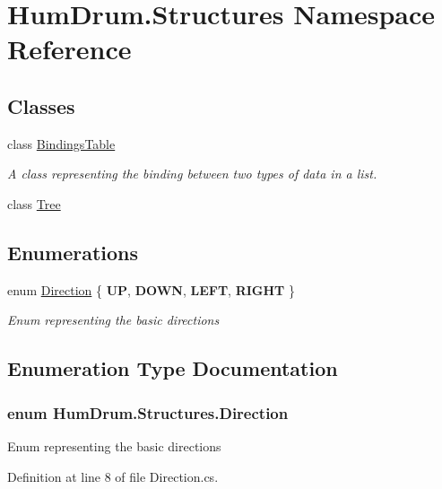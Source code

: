 \hypertarget{namespaceHumDrum_1_1Structures}{}\section{Hum\+Drum.\+Structures Namespace Reference}
\label{namespaceHumDrum_1_1Structures}
\subsection*{Classes}
\begin{DoxyCompactItemize}
\item 
class \hyperlink{classHumDrum_1_1Structures_1_1BindingsTable}{Bindings\+Table}
\begin{DoxyCompactList}\small\item\em A class representing the binding between two types of data in a list. \end{DoxyCompactList}\item 
class \hyperlink{classHumDrum_1_1Structures_1_1Tree}{Tree}
\end{DoxyCompactItemize}
\subsection*{Enumerations}
\begin{DoxyCompactItemize}
\item 
enum \hyperlink{namespaceHumDrum_1_1Structures_a83ca1f04475980cb7e79d471cc746dd3}{Direction} \{ {\bfseries U\+P}, 
{\bfseries D\+O\+W\+N}, 
{\bfseries L\+E\+F\+T}, 
{\bfseries R\+I\+G\+H\+T}
 \}\begin{DoxyCompactList}\small\item\em Enum representing the basic directions \end{DoxyCompactList}
\end{DoxyCompactItemize}


\subsection{Enumeration Type Documentation}
\hypertarget{namespaceHumDrum_1_1Structures_a83ca1f04475980cb7e79d471cc746dd3}{}
\subsubsection[{Direction}]{\setlength{\rightskip}{0pt plus 5cm}enum {\bf Hum\+Drum.\+Structures.\+Direction}\hspace{0.3cm}{\ttfamily [strong]}}\label{namespaceHumDrum_1_1Structures_a83ca1f04475980cb7e79d471cc746dd3}


Enum representing the basic directions 



Definition at line 8 of file Direction.\+cs.

